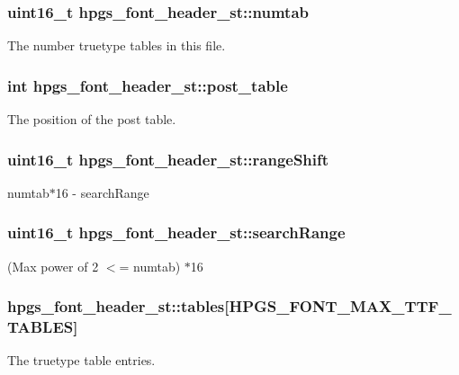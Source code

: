 \subsubsection[{numtab}]{\setlength{\rightskip}{0pt plus 5cm}uint16\_\-t {\bf hpgs\_\-font\_\-header\_\-st::numtab}}\label{structhpgs__font__header__st_a73194636df1a30d97c3892baec5fcee1}
The number truetype tables in this file. 
\subsubsection[{post\_\-table}]{\setlength{\rightskip}{0pt plus 5cm}int {\bf hpgs\_\-font\_\-header\_\-st::post\_\-table}}\label{structhpgs__font__header__st_ad063ab4b87fe74878f0effba5bd4edf3}
The position of the post table. 
\subsubsection[{rangeShift}]{\setlength{\rightskip}{0pt plus 5cm}uint16\_\-t {\bf hpgs\_\-font\_\-header\_\-st::rangeShift}}\label{structhpgs__font__header__st_acd34db3fd2dd32cb4f492390a9dd208f}
numtab$\ast$16 -\/ searchRange 
\subsubsection[{searchRange}]{\setlength{\rightskip}{0pt plus 5cm}uint16\_\-t {\bf hpgs\_\-font\_\-header\_\-st::searchRange}}\label{structhpgs__font__header__st_a668c08868584b25e54cafc16f1a35d73}
(Max power of 2 $<$= numtab) $\ast$16 
\subsubsection[{tables}]{ {\bf hpgs\_\-font\_\-header\_\-st::tables}[HPGS\_\-FONT\_\-MAX\_\-TTF\_\-TABLES]}\label{structhpgs__font__header__st_af54ad94acf0f8f8a41a9766914282db6}
The truetype table entries. 
